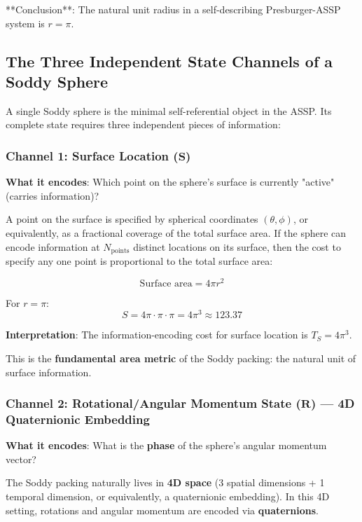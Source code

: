 \documentclass[11pt,a4paper]{article}
\begin{document}
  **Conclusion**: The natural unit radius in a self-describing Presburger-ASSP system is $r = \pi$.

  \subsection{The Three Independent State Channels of a Soddy Sphere}

  A single Soddy sphere is the minimal self-referential object in the ASSP. Its complete state requires three independent pieces of information:

  \subsubsection{Channel 1: Surface Location ($\mathbf{S}$)}

  \noindent\textbf{What it encodes}: Which point on the sphere's surface is currently "active" (carries information)?

  A point on the surface is specified by spherical coordinates $(\theta, \phi)$, or equivalently, as a fractional coverage of the total surface area. If the sphere can encode information at $N_{\text{points}}$ distinct locations on its surface, then the cost to specify any one point is proportional to the total surface area:

  \[
  \text{Surface area} = 4\pi r^2
  \]

  For $r = \pi$:
  \[
  S = 4\pi \cdot \pi \cdot \pi = 4\pi^3 \approx 123.37
  \]

  \noindent\textbf{Interpretation}: The information-encoding cost for surface location is $T_S = 4\pi^3$.

  \noindent This is the \textbf{fundamental area metric} of the Soddy packing: the natural unit of surface information.

  \subsubsection{Channel 2: Rotational/Angular Momentum State ($\mathbf{R}$) — 4D Quaternionic Embedding}

  \noindent\textbf{What it encodes}: What is the \textbf{phase} of the sphere's angular momentum vector?

  The Soddy packing naturally lives in \textbf{4D space} (3 spatial dimensions + 1 temporal dimension, or equivalently, a quaternionic embedding). In this 4D setting, rotations and angular momentum are encoded via \textbf{quaternions}.
\end{document}
